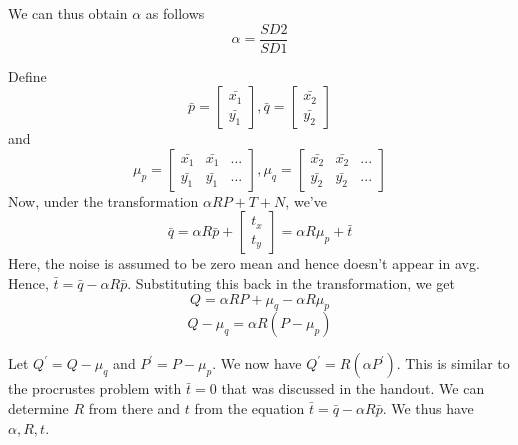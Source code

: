 \documentclass[11pt]{article}
\begin{document}
\begin{enumerate}
\begin{itemize}
We can thus obtain $\alpha$ as follows 
\begin{equation}
\alpha=\frac{SD2}{SD1}
\end{equation} 

Define \[ \bar{p}=
		\begin{bmatrix}
		\bar{x_1}\\
		\bar{y_1}
		\end{bmatrix}		  
		, \bar{q}=
		\begin{bmatrix}
		\bar{x_2}\\
		\bar{y_2}
		\end{bmatrix}		  
		\] 
		and
		\[ \mu_p=
		\begin{bmatrix}
		\bar{x_1} & \bar{x_1} & ...\\
		\bar{y_1} & \bar{y_1} & ...
		\end{bmatrix}		  
		, \mu_q=
		\begin{bmatrix}
		\bar{x_2} & \bar{x_2} & ...\\
		\bar{y_2} & \bar{y_2} & ...
		\end{bmatrix}		  
		\] 
Now, under the transformation $\alpha RP+T+N$, we've 
\begin{equation}
\bar{q}=\alpha R\bar{p} + \begin{bmatrix}
        t_x\\
        t_y
        \end{bmatrix}=\alpha R\mu_p + \bar{t}
\end{equation}
Here, the noise is assumed to be zero mean and hence doesn't appear in avg. 
        Hence, $\bar{t}=\bar{q}-\alpha R\bar{p}$. Substituting this back in the transformation, we get 
        \begin{equation}
        Q= \alpha RP+ \mu_q-\alpha R\mu_p
        \end{equation} 
        \begin{equation}
        Q-\mu_q= \alpha R(P -\mu_p)
        \end{equation} 
              	
Let $Q^{'}=Q-\mu_q$ and $P^{'}=P -\mu_p$. We now have $Q^{'}=R(\alpha P^{'})$. This is similar to the procrustes problem with $\bar{t} =0$ that was discussed in the handout. We can determine $R$ from there and $t$ from the equation $\bar{t}=\bar{q}-\alpha R\bar{p}$.
        We thus have $\alpha, R , t$.  
\end{itemize}




\end{enumerate}
\end{document}
